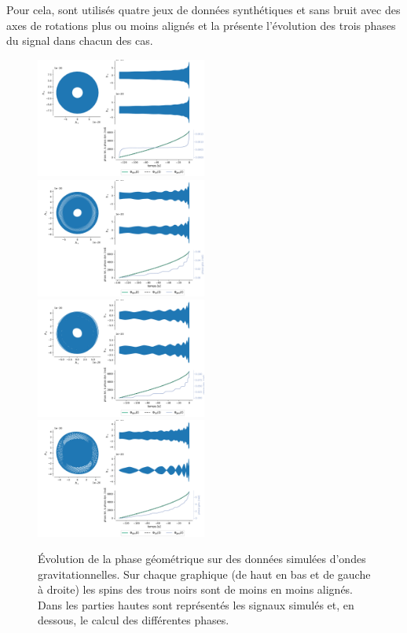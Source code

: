 Pour cela, sont utilisés quatre jeux de données synthétiques et sans bruit avec des axes de rotations plus ou moins alignés et la   présente l’évolution des trois phases du signal dans chacun des cas.
\\
\begin{figure}[h]
	\includegraphics[width=0.5\textwidth]{fig/part-3/GW_full_1.pdf}\hfill
	\includegraphics[width=0.5\textwidth]{fig/part-3/GW_full_2.pdf}\\
	\includegraphics[width=0.5\textwidth]{fig/part-3/GW_full_3.pdf}\hfill
	\includegraphics[width=0.5\textwidth]{fig/part-3/GW_full_4.pdf}
	\caption[Évolution de la phase géométrique sur des données simulées d'ondes gravitationnelles]{Évolution de la phase géométrique sur des données simulées d'ondes gravitationnelles. Sur chaque graphique (de haut en bas et de gauche à droite) les spins des trous noirs sont de moins en moins alignés. Dans les parties hautes sont représentés les signaux simulés et, en dessous, le calcul des différentes phases.}
	\label{fig:phase_g2GW}
\end{figure}

